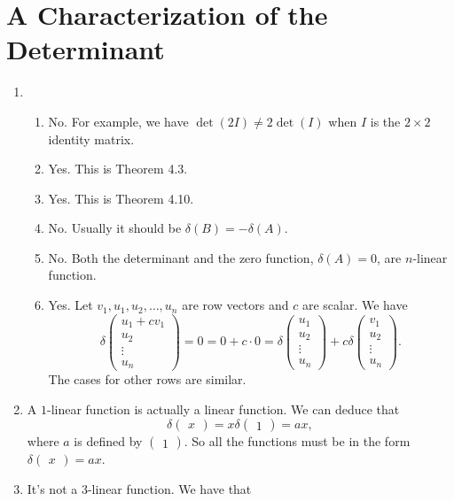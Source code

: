 \section{A Characterization of the Determinant}
\begin{enumerate}
\item \begin{enumerate}
\item No. For example, we have $\det(2I)\neq 2\det(I)$ when $I$ is the $2\times 2$ identity matrix.
\item Yes. This is Theorem 4.3.
\item Yes. This is Theorem 4.10.
\item No. Usually it should be $\delta(B)=-\delta(A)$.
\item No. Both the determinant and the zero function, $\delta(A)=0$, are $n$-linear function.
\item Yes. Let $v_1,u_1,u_2,\ldots ,u_n$ are row vectors and $c$ are scalar. We have 
\[\delta\begin{pmatrix}u_1+cv_1\\u_2\\\vdots \\u_n\end{pmatrix}=0=0+c\cdot 0=\delta\begin{pmatrix}u_1\\u_2\\\vdots \\u_n\end{pmatrix}+c\delta\begin{pmatrix}v_1\\u_2\\\vdots \\u_n\end{pmatrix}.\]
The cases for other rows are similar.
\end{enumerate}
\item A $1$-linear function is actually a linear function. We can deduce that 
\[\delta\begin{pmatrix}x\end{pmatrix}=x\delta\begin{pmatrix}1\end{pmatrix}=ax,\]
where $a$ is defined by $\begin{pmatrix}1\end{pmatrix}$. So all the functions must be in the form $\delta\begin{pmatrix}x\end{pmatrix}=ax$.
\item It's not a $3$-linear function. We have that 

\end{enumerate}
